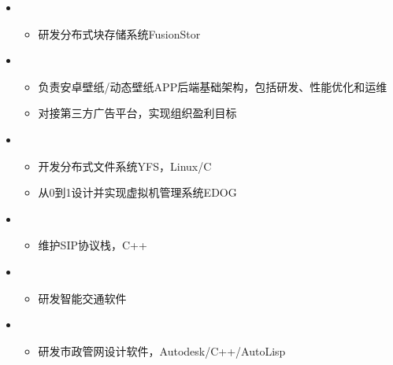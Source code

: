 \begin{itemize}[leftmargin=*]
    \item 
        {\small
        \begin{itemize}
            \item 研发分布式块存储系统FusionStor
        \end{itemize}
        }
    \item
        {\small
        \begin{itemize}
            \item 负责安卓壁纸/动态壁纸APP后端基础架构，包括研发、性能优化和运维
            \item 对接第三方广告平台，实现组织盈利目标
        \end{itemize}
        }
    \item
        {\small
        \begin{itemize}
            \item 开发分布式文件系统YFS，Linux/C
            \item 从0到1设计并实现虚拟机管理系统EDOG
        \end{itemize}
        }
    \item 
        {\small
        \begin{itemize}
            \item 维护SIP协议栈，C++
        \end{itemize}
        }
    \item 
        {\small
        \begin{itemize}
            \item 研发智能交通软件
        \end{itemize}
        }
    \item 
        {\small
        \begin{itemize}
            \item 研发市政管网设计软件，Autodesk/C++/AutoLisp
        \end{itemize}
        }
\end{itemize}
